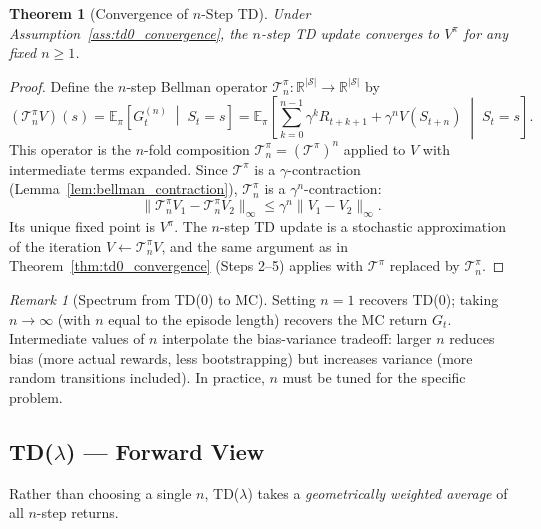 \documentclass[11pt,a4paper]{article}
\theoremstyle{definition}
\theoremstyle{plain}
\newtheorem{theorem}{Theorem}[section]
\theoremstyle{remark}
\newtheorem{remark}{Remark}[section]
\newcommand{\E}{\mathbb{E}}
\newcommand{\R}{\mathbb{R}}
\begin{document}
\begin{theorem}[Convergence of $n$-Step TD]
\label{thm:nstep_convergence}
Under Assumption~\ref{ass:td0_convergence}, the $n$-step TD update converges to $V^\pi$ for any fixed $n \geq 1$.
\end{theorem}

\begin{proof}
Define the $n$-step Bellman operator $\mathcal{T}_n^\pi: \R^{|\mathcal{S}|} \to \R^{|\mathcal{S}|}$ by
\begin{equation}
    (\mathcal{T}_n^\pi V)(s) = \E_\pi\!\left[G_t^{(n)} \;\middle|\; S_t = s\right] = \E_\pi\!\left[\sum_{k=0}^{n-1}\gamma^k R_{t+k+1} + \gamma^n V(S_{t+n}) \;\middle|\; S_t = s\right].
    \label{eq:nstep_operator}
\end{equation}
This operator is the $n$-fold composition $\mathcal{T}_n^\pi = (\mathcal{T}^\pi)^n$ applied to $V$ with intermediate terms expanded. Since $\mathcal{T}^\pi$ is a $\gamma$-contraction (Lemma~\ref{lem:bellman_contraction}), $\mathcal{T}_n^\pi$ is a $\gamma^n$-contraction:
\begin{equation}
    \|\mathcal{T}_n^\pi V_1 - \mathcal{T}_n^\pi V_2\|_\infty \leq \gamma^n \|V_1 - V_2\|_\infty.
\end{equation}
Its unique fixed point is $V^\pi$. The $n$-step TD update is a stochastic approximation of the iteration $V \leftarrow \mathcal{T}_n^\pi V$, and the same argument as in Theorem~\ref{thm:td0_convergence} (Steps 2--5) applies with $\mathcal{T}^\pi$ replaced by $\mathcal{T}_n^\pi$.
\end{proof}

\begin{remark}[Spectrum from TD(0) to MC]
\label{rem:nstep_spectrum}
Setting $n = 1$ recovers TD(0); taking $n \to \infty$ (with $n$ equal to the episode length) recovers the MC return $G_t$. Intermediate values of $n$ interpolate the bias-variance tradeoff: larger $n$ reduces bias (more actual rewards, less bootstrapping) but increases variance (more random transitions included). In practice, $n$ must be tuned for the specific problem.
\end{remark}

\subsection{TD($\lambda$) --- Forward View}
\label{subsec:td_lambda_forward}

Rather than choosing a single $n$, TD($\lambda$) takes a \emph{geometrically weighted average} of all $n$-step returns.
\end{document}
